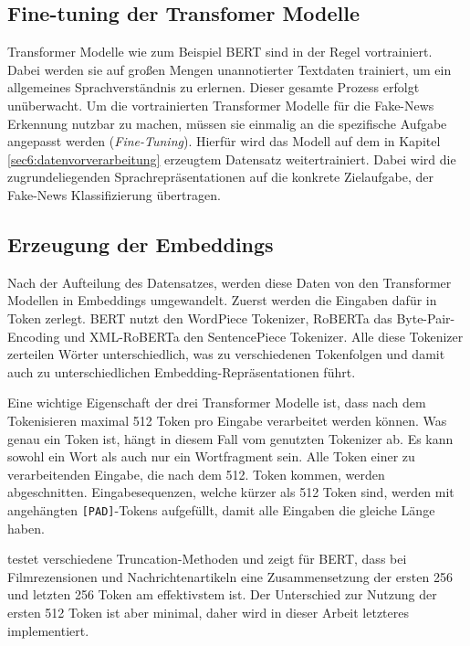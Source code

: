 \subsection{Fine-tuning der Transfomer Modelle}

Transformer Modelle wie zum Beispiel BERT sind in der Regel vortrainiert. Dabei werden sie auf großen Mengen unannotierter Textdaten trainiert, um ein allgemeines Sprachverständnis 
zu erlernen. Dieser gesamte Prozess erfolgt unüberwacht.
Um die vortrainierten Transformer Modelle für die Fake-News Erkennung nutzbar zu machen, müssen sie einmalig an die spezifische Aufgabe angepasst werden (\textit{Fine-Tuning}).
Hierfür wird das Modell auf dem in Kapitel \ref{sec6:datenvorverarbeitung} erzeugtem Datensatz weitertrainiert. Dabei wird die zugrundeliegenden Sprachrepräsentationen auf 
die konkrete Zielaufgabe, der Fake-News Klassifizierung übertragen.

\subsection{Erzeugung der Embeddings}

Nach der Aufteilung des Datensatzes, werden diese Daten von den Transformer Modellen in Embeddings umgewandelt.
Zuerst werden die Eingaben dafür in Token zerlegt.
BERT nutzt den WordPiece Tokenizer, RoBERTa das Byte-Pair-Encoding und XML-RoBERTa den SentencePiece Tokenizer.
Alle diese Tokenizer zerteilen Wörter unterschiedlich, was zu verschiedenen Tokenfolgen und damit auch zu unterschiedlichen Embedding-Repräsentationen führt.

Eine wichtige Eigenschaft der drei Transformer Modelle ist, dass nach dem Tokenisieren maximal 512 Token pro Eingabe verarbeitet werden können.
Was genau ein Token ist, hängt in diesem Fall vom genutzten Tokenizer ab. Es kann sowohl ein Wort als auch nur ein Wortfragment sein.
Alle Token einer zu verarbeitenden Eingabe, die nach dem 512. Token kommen, werden abgeschnitten.
Eingabesequenzen, welche kürzer als 512 Token sind, werden mit angehängten \texttt{[PAD]}-Tokens aufgefüllt, damit alle Eingaben die gleiche Länge haben.

\cite{sun2020finetuneberttextclassification} testet verschiedene Truncation-Methoden und zeigt für BERT, dass bei Filmrezensionen und Nachrichtenartikeln eine 
Zusammensetzung der ersten 256 und letzten 256 Token am effektivstem ist. Der Unterschied zur Nutzung der ersten 512 Token ist aber minimal, daher wird in dieser Arbeit letzteres
implementiert.

